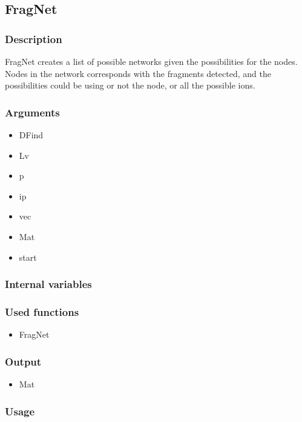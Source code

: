 \subsection{FragNet}
\subsubsection{Description}
FragNet creates a list of possible networks given the possibilities for the nodes. Nodes in the network corresponds with the fragments detected, and the possibilities could be using or not the node, or all the possible ions. 
\subsubsection{Arguments}
\begin{itemize}
\item DFind
\item Lv
\item p
\item ip
\item vec
\item Mat
\item start
\end{itemize}
\subsubsection{Internal variables}
\subsubsection{Used functions}
\begin{itemize}
\item FragNet
\end{itemize}
\subsubsection{Output}
\begin{itemize}
\item Mat
\end{itemize}
\subsubsection{Usage}



